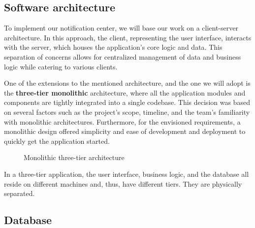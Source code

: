 \subsection{Software architecture}
To implement our notification center, we will base our work on a client-server architecture.
In this approach, the client, representing the user interface, interacts with the server, which houses
the application's core logic and data. This separation of concerns allows for centralized management
of data and business logic while catering to various clients.

One of the extensions to the mentioned architecture, and the one we will adopt is the \textbf{three-tier monolithic}
architecture, where all the application modules and components are tightly integrated into a single
codebase. This decision was based on several factors such as the project's scope, timeline, and the
team's familiarity with monolithic architectures. Furthermore, for the envisioned requirements,
a monolithic design offered simplicity and ease of development and deployment to quickly get the
application started. \\

\begin{figure}[hbt!]
      \centering
      
      \caption{Monolithic three-tier architecture}
      \label{monolithic}
\end{figure}

In a three-tier application, the user interface, business logic, and the database all reside
on different machines and, thus, have different tiers. They are physically separated.





\subsection{Database}
